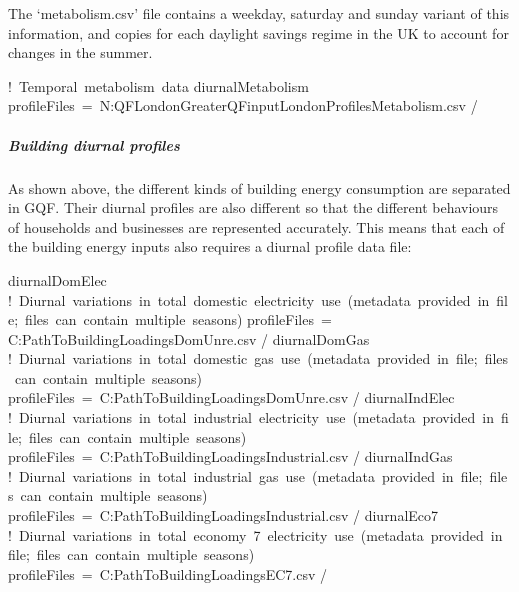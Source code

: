 \documentclass[letterpaper,10pt,english]{sphinxmanual}
\begin{document}
The ‘metabolism.csv’ file contains a weekday, saturday and sunday
variant of this information, and copies for each daylight savings regime
in the UK to account for changes in the summer.

%
\begin{sphinxVerbatim}[commandchars=\\\{\}]
! Temporal metabolism data
\PYGZam{}diurnalMetabolism
    profileFiles = \PYGZsq{}N:\PYGZbs{}QF\PYGZus{}London\PYGZbs{}GreaterQF\PYGZus{}input\PYGZbs{}London\PYGZbs{}Profiles\PYGZbs{}\PYGZbs{}Metabolism.csv\PYGZsq{}
/
\end{sphinxVerbatim}


\subparagraph{Building diurnal profiles}
\label{\detokenize{Tutorials/GQF:building-diurnal-profiles}}
As shown above, the different kinds of building energy consumption are
separated in GQF. Their diurnal profiles are also different so that the
different behaviours of households and businesses are represented
accurately. This means that each of the building energy inputs also
requires a diurnal profile data file:

%
\begin{sphinxVerbatim}[commandchars=\\\{\}]
\PYGZam{}diurnalDomElec
   ! Diurnal variations in total domestic electricity use (metadata provided in file; files can contain multiple seasons)
   profileFiles =
\PYGZsq{}C:\PYGZbs{}Path\PYGZbs{}To\PYGZbs{}BuildingLoadings\PYGZus{}DomUnre.csv\PYGZsq{}
/
\PYGZam{}diurnalDomGas
   ! Diurnal variations in total domestic gas use (metadata provided in file; files can contain multiple seasons)
   profileFiles = \PYGZsq{}C:\PYGZbs{}Path\PYGZbs{}To\PYGZbs{}BuildingLoadings\PYGZus{}DomUnre.csv\PYGZsq{}
/
\PYGZam{}diurnalIndElec
   ! Diurnal variations in total industrial electricity use (metadata provided in file; files can contain multiple seasons)
   profileFiles = \PYGZsq{}C:\PYGZbs{}Path\PYGZbs{}To\PYGZbs{}BuildingLoadings\PYGZus{}Industrial.csv\PYGZsq{}
/
\PYGZam{}diurnalIndGas
   ! Diurnal variations in total industrial gas use (metadata provided in file; files can contain multiple seasons)
   profileFiles = \PYGZsq{}C:\PYGZbs{}Path\PYGZbs{}To\PYGZbs{}BuildingLoadings\PYGZus{}Industrial.csv\PYGZsq{}
/
\PYGZam{}diurnalEco7
   ! Diurnal variations in total economy 7 electricity use (metadata provided in file; files can contain multiple seasons)
   profileFiles = \PYGZsq{}C:\PYGZbs{}Path\PYGZbs{}To\PYGZbs{}BuildingLoadings\PYGZus{}EC7.csv\PYGZsq{}
/
\end{sphinxVerbatim}
\end{document}
